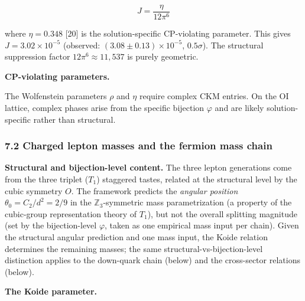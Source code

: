 \documentclass[
]{article}
\begin{document}
\[J = \frac{\eta}{12\pi^6}\]

where \(\eta = 0.348\) {[}20{]} is the solution-specific CP-violating
parameter. This gives \(J = 3.02 \times 10^{-5}\) (observed:
\((3.08 \pm 0.13) \times 10^{-5}\), \(0.5\sigma\)). The structural
suppression factor \(12\pi^6 \approx 11{,}537\) is purely geometric.

\textbf{CP-violating parameters.}

The Wolfenstein parameters \(\rho\) and \(\eta\) require complex CKM
entries. On the OI lattice, complex phases arise from the specific
bijection \(\varphi\) and are likely solution-specific rather than
structural.

\hypertarget{charged-lepton-masses-and-the-fermion-mass-chain}{%
\subsubsection{7.2 Charged lepton masses and the fermion mass
chain}\label{charged-lepton-masses-and-the-fermion-mass-chain}}

\textbf{Structural and bijection-level content.} The three lepton
generations come from the three triplet (\(T_1\)) staggered tastes,
related at the structural level by the cubic symmetry \(O\). The
framework predicts the \emph{angular position}
\(\theta_0 = C_2/d^2 = 2/9\) in the \(\mathbb{Z}_3\)-symmetric mass
parametrization (a property of the cubic-group representation theory of
\(T_1\)), but not the overall splitting magnitude (set by the
bijection-level \(\varphi\), taken as one empirical mass input per
chain). Given the structural angular prediction and one mass input, the
Koide relation determines the remaining masses; the same
structural-vs-bijection-level distinction applies to the down-quark
chain (below) and the cross-sector relations (below).

\textbf{The Koide parameter.}
\end{document}
